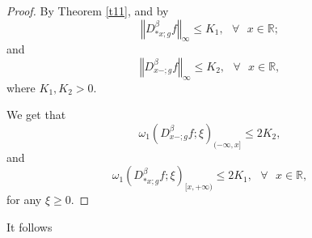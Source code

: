 \documentclass[10pt]{NSP1}
\numberwithin{equation}{section}
\begin{document}
\begin{proof}
By Theorem \ref{t11}, and by
\begin{equation*}
\left \Vert D_{\ast x;g}^{\beta }f\right \Vert _{\infty }\leq K_{1},\text{ \ }
\forall \text{ }x\in \mathbb{R};
\end{equation*}
and
\begin{equation*}
\left \Vert D_{x-;g}^{\beta }f\right \Vert _{\infty }\leq K_{2},\text{ \ }%
\forall \text{ }x\in \mathbb{R},
\end{equation*}
where $K_{1},K_{2}>0.$

We get that
\begin{equation*}
\omega _{1}\left( D_{x-;g}^{\beta }f;\xi \right) _{(-\infty ,x]}\leq 2K_{2},
\end{equation*}
and
\begin{equation*}
\omega _{1}\left( D_{\ast x;g}^{\beta }f;\xi \right) _{[x,+\infty )}\leq
2K_{1},\text{ \ }\forall \text{ }x\in \mathbb{R},
\end{equation*}
for any $\xi \geq 0.$
\end{proof}

It follows
\end{document}
